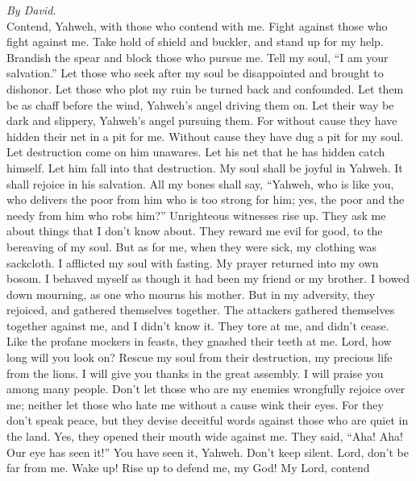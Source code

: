 \emph{By David.}\\
 Contend, Yahweh, with those who contend with me. Fight
against those who fight against me.  Take hold of shield
and buckler, and stand up for my help.  Brandish the spear
and block those who pursue me. Tell my soul, ``I am your salvation.''
 Let those who seek after my soul be disappointed and
brought to dishonor. Let those who plot my ruin be turned back and
confounded.  Let them be as chaff before the wind,
Yahweh's angel driving them on.  Let their way be dark and
slippery, Yahweh's angel pursuing them.  For without cause
they have hidden their net in a pit for me. Without cause they have dug
a pit for my soul.  Let destruction come on him unawares.
Let his net that he has hidden catch himself. Let him fall into that
destruction.  My soul shall be joyful in Yahweh. It shall
rejoice in his salvation.  All my bones shall say,
``Yahweh, who is like you, who delivers the poor from him who is too
strong for him; yes, the poor and the needy from him who robs him?''
 Unrighteous witnesses rise up. They ask me about things
that I don't know about.  They reward me evil for good,
to the bereaving of my soul.  But as for me, when they
were sick, my clothing was sackcloth. I afflicted my soul with fasting.
My prayer returned into my own bosom.  I behaved myself
as though it had been my friend or my brother. I bowed down mourning, as
one who mourns his mother.  But in my adversity, they
rejoiced, and gathered themselves together. The attackers gathered
themselves together against me, and I didn't know it. They tore at me,
and didn't cease.  Like the profane mockers in feasts,
they gnashed their teeth at me.  Lord, how long will you
look on? Rescue my soul from their destruction, my precious life from
the lions.  I will give you thanks in the great assembly.
I will praise you among many people.  Don't let those who
are my enemies wrongfully rejoice over me; neither let those who hate me
without a cause wink their eyes.  For they don't speak
peace, but they devise deceitful words against those who are quiet in
the land.  Yes, they opened their mouth wide against me.
They said, ``Aha! Aha! Our eye has seen it!''  You have
seen it, Yahweh. Don't keep silent. Lord, don't be far from me.
 Wake up! Rise up to defend me, my God! My Lord, contend
